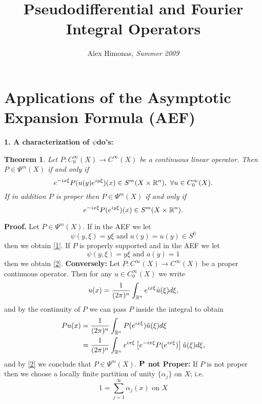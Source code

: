 \documentclass[12pt,reqno]{amsart}
\theoremstyle{plain}  %
\newtheorem{theorem}{Theorem}
\theoremstyle{definition}
\newcommand{\nin}{\noindent}
\begin{document}
\title{Pseudodifferential and Fourier Integral Operators}
\author{Alex Himonas, {\it Summer 2009}}
\maketitle
\setcounter{section}{5}
\section{Applications of the Asymptotic Expansion Formula (AEF)}
\vskip0.2in
\nin
{\bf 1. A characterization of $ \psi$do's:}
\begin{theorem}
	\label{thm1}
	Let $ P: C^\infty_0 (X) \longrightarrow C^\infty (X) $
be a continuous linear operator.  Then $ P \in \Psi^m (X) $ if and only if
\begin{equation}
	\label{1}
	e^{-ix \xi} P(u(y) e^{iy \xi}) (x) \in S^m (X \times \Bbb R^n), \ \forall u \in
C^\infty_0 (X). 
\end{equation}
If in addition $ P $ is proper then $ P \in \Psi^m(X) $  if  and only if
\begin{equation}
	\label{2}
	e^{-ix \xi} P(e^{i y \xi} )(x) \in S^m(X \times \Bbb R^n). 
\end{equation}
\end{theorem}
\nin
{\bf Proof.} Let $ P \in \Psi^m(X)$.  If in the AEF we
let
 $$\psi(y, \xi) = y  \xi \text{ and } a(y) = u(y) \in S^0$$
 then we obtain \eqref{1}.  If $ P $ is properly supported and in the AEF we let
$$\psi (y, \xi) = y  \xi \text{ and } a(y) = 1 $$
then we obtain \eqref{2}.
\vskip0.1in
\nin
{\bf Conversely:}  Let $ P: C^\infty(X) \longrightarrow C^\infty (X) $ be a proper
continuous operator.  Then for any $ u \in C^\infty_0 (X) $ we write
$$u(x) = \frac{1}{(2 \pi)^n} \int_{\Bbb R^n} e^{ix \xi} \hat u (\xi) d \xi,$$
and by the continuity of $ P $ we can pass $ P $ inside the integral to obtain
\begin{equation}
	\begin{split}
Pu(x) &= \frac{1}{(2\pi)^n} \int_{\Bbb R^n} P(e^{ix \xi}) \hat u (\xi) d \xi \\
&= \frac{1}{(2 \pi)^n} \int_{\Bbb R^n} e^{i x \xi} \left [ e^{-ix \xi} P(e^{ix \xi})
\right ] \hat u (\xi) d \xi, \end{split}
\end{equation}
and by \eqref{2} we conclude that $ P \in \Psi^m (X)$.
\vskip0.1in
\nin
{\bf $ \bold P $ not Proper:}  If $ P $ is not proper then we choose a locally finite
partition of unity $ \{\alpha_j\} $ on $ X$; i.e.
$$1 = \sum^\infty_{j=1} \alpha_j (x) \text{ on } X$$
\end{document}

